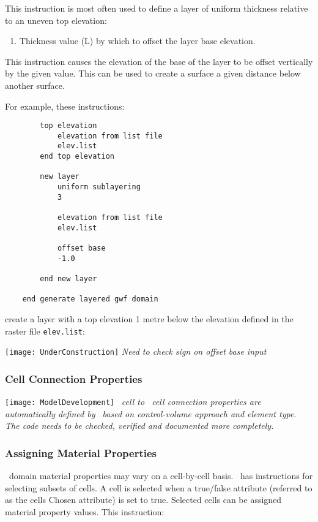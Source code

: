 {This instruction is most often used to define a layer of uniform thickness relative to an uneven top elevation:

    {\squish
    \begin{enumerate}
    \item {} Thickness value (L) by which to offset the layer base elevation.
    \end{enumerate}
    This instruction causes the elevation of the base of the layer to be offset vertically by the given value.  This
    can be used to create a surface a given distance below another surface.
}

    For example, these instructions:
\begin{verbatim}
        top elevation
            elevation from list file
            elev.list
        end top elevation

        new layer
            uniform sublayering
            3

            elevation from list file
            elev.list

            offset base
            -1.0

        end new layer

    end generate layered gwf domain
\end{verbatim}
 create a layer with a top elevation 1 metre below the elevation defined in the raster file \texttt{elev.list}:

\texttt{[image: UnderConstruction]} \textit{Need to check sign on \textsf{offset base} input}

\subsubsection{Cell Connection Properties}  \texttt{[image: ModelDevelopment]} \textit{
\gwf\ cell to \gwf\ cell connection properties are automatically defined by \mut\ based on control-volume approach and element type. The code needs to be checked, verified and documented more completely.}



\subsubsection{Assigning Material Properties}   \label{section:matprops}

\gwf\ domain material properties may vary on a cell-by-cell  basis.  \mut\ has instructions for selecting subsets of cells. A cell is selected when a true/false attribute (referred to as  the cells \textsf{Chosen} attribute) is set to true. Selected cells can be assigned material property values.  This instruction:

}
